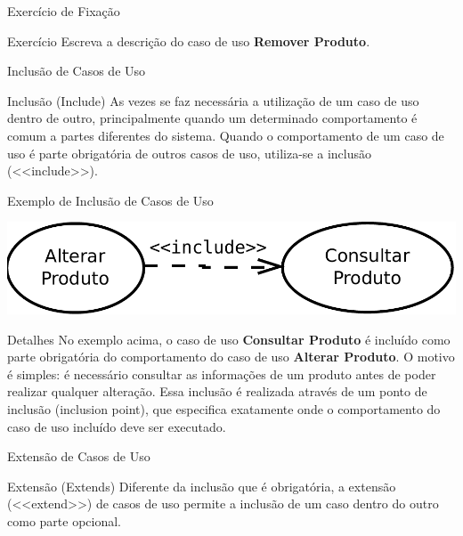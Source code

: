 \documentclass[xcolor=x11names,compress]{beamer}
\begin{document}
\begin{frame}{Exercício de Fixação}

\begin{alertblock}{Exercício}
Escreva a descrição do caso de uso \textbf{Remover Produto}.
\end{alertblock}

\end{frame}

\begin{frame}{Inclusão de Casos de Uso}

\begin{alertblock}{Inclusão (Include)}
As vezes se faz necessária a utilização de um caso de uso dentro de outro, principalmente quando um determinado comportamento é comum a partes diferentes do sistema. Quando o comportamento de um caso de uso é parte obrigatória de outros casos de uso, utiliza-se a inclusão (<<include>>).

\end{alertblock}

\end{frame}

\begin{frame}{Exemplo de Inclusão de Casos de Uso}

\centering \includegraphics[keepaspectratio,width=.8\textwidth]{Include_Caso_de_Uso}

\begin{alertblock}{Detalhes}
No exemplo acima, o caso de uso \textbf{Consultar Produto} é incluído como parte obrigatória do comportamento do caso de uso \textbf{Alterar Produto}. O motivo é simples: é necessário consultar as informações de um produto antes de poder realizar qualquer alteração. Essa inclusão é realizada através de um ponto de inclusão (inclusion point), que especifica exatamente onde o comportamento do caso de uso incluído deve ser executado.
\end{alertblock}

\end{frame}

\begin{frame}{Extensão de Casos de Uso}

\begin{alertblock}{Extensão (Extends)}
Diferente da inclusão que é obrigatória, a extensão (<<extend>>) de casos de uso permite a inclusão de um caso dentro do outro como parte opcional. 

\end{alertblock}

\end{frame}
\end{document}

